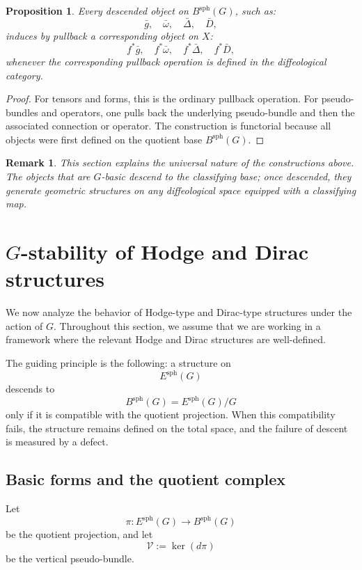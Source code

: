 \documentclass[11pt]{amsart}
\newtheorem{proposition}[definition]{Proposition}
\newtheorem{remark}[definition]{Remark}
\begin{document}
\begin{proposition}
Every descended object on \(B^{\mathrm{sph}}(G)\), such as:
\[
\bar g,\quad
\bar\omega,\quad
\bar\Delta,\quad
\bar D,
\]
induces by pullback a corresponding object on \(X\):
\[
f^*\bar g,\quad
f^*\bar\omega,\quad
f^*\bar\Delta,\quad
f^*\bar D,
\]
whenever the corresponding pullback operation is defined in the diffeological category.
\end{proposition}

\begin{proof}
For tensors and forms, this is the ordinary pullback operation. For pseudo-bundles and operators, one pulls back the underlying pseudo-bundle and then the associated connection or operator. The construction is functorial because all objects were first defined on the quotient base \(B^{\mathrm{sph}}(G)\).
\end{proof}

\begin{remark}
This section explains the universal nature of the constructions above. The objects that are \(G\)-basic descend to the classifying base; once descended, they generate geometric structures on any diffeological space equipped with a classifying map.
\end{remark}

\section{\(G\)-stability of Hodge and Dirac structures}
\label{sec:G-stability-Hodge-Dirac}

We now analyze the behavior of Hodge-type and Dirac-type structures under the
action of \(G\). Throughout this section, we assume that we are working in a
framework where the relevant Hodge and Dirac structures are well-defined.

The guiding principle is the following: a structure on
\[
E^{\mathrm{sph}}(G)
\]
descends to
\[
B^{\mathrm{sph}}(G)=E^{\mathrm{sph}}(G)/G
\]
only if it is compatible with the quotient projection. When this compatibility
fails, the structure remains defined on the total space, and the failure of
descent is measured by a defect.

\subsection{Basic forms and the quotient complex}

Let
\[
\pi:E^{\mathrm{sph}}(G)\to B^{\mathrm{sph}}(G)
\]
be the quotient projection, and let
\[
\mathcal V:=\ker(d\pi)
\]
be the vertical pseudo-bundle.
\end{document}
